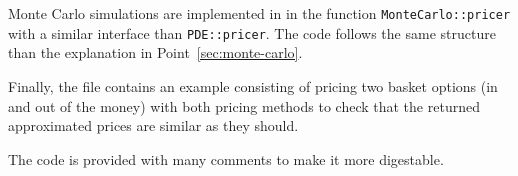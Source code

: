 \documentclass[english]{article}
\numberwithin{equation}{section}
\numberwithin{figure}{section}
\theoremstyle{bolddescit}
\theoremstyle{definition}
\theoremstyle{definition}
\theoremstyle{plain}
\theoremstyle{plain}
\theoremstyle{bolddesc}
\theoremstyle{plain}
\theoremstyle{remark}
\begin{document}
Monte Carlo simulations are implemented in  in the function \texttt{MonteCarlo::pricer} with a similar interface than \texttt{PDE::pricer}. The code follows the same structure than the explanation in Point~\ref{sec:monte-carlo}.

Finally, the file  contains an example consisting of pricing two basket options (in and out of the money) with both pricing methods to check that the returned approximated prices are similar as they should.

The code is provided with many comments to make it more digestable.


\needspace{5cm}

\needspace{5cm}

\needspace{5cm}


\pagebreak
\renewcommand{\bibfont}{\normalfont\small}
\printbibliography
\end{document}
